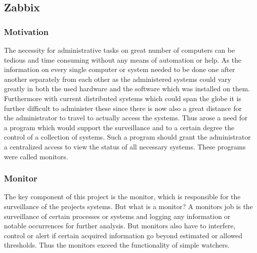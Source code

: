 \subsection{Zabbix}

\subsubsection{Motivation}
	The necessity for administrative tasks on great number of computers can be tedious and time consuming without any means of automation or help. As the information on every single computer or system needed to be done one after another separately from each other as the administered systems could vary greatly in both the used hardware and the software which was installed on them. Furthermore with current distributed systems which could span the globe it is further difficult to administer these since there is now also a great distance for the administrator to travel to actually access the systems. Thus arose a need for a program which would support the surveillance and to a certain degree the control of a collection of systems. Such a program should grant the administrator a centralized access to view the status of all necessary systems. These programs were called monitors.
\subsubsection{Monitor}
	The key component of this project is the monitor, which is responsible for the surveillance of the projects systems. But what is a monitor? A monitors job is the surveillance of certain processes or systems and logging any information or notable occurrences for further analysis. But monitors also have to interfere, control or alert if certain acquired information go beyond estimated or allowed thresholds. Thus the monitors exceed the functionality of simple watchers.
